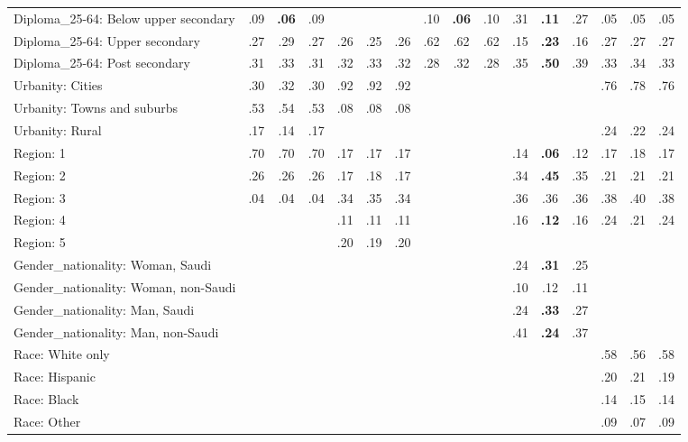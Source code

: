 \begin{tabular}[t]{lccccccccccccccc}
\addlinespace
Diploma\_25-64: Below upper secondary & .09 & \textbf{.06} & .09 &  &  &  & .10 & \textbf{.06} & .10 & .31 & \textbf{.11} & .27 & .05 & .05 & .05\\
Diploma\_25-64: Upper secondary & .27 & .29 & .27 & .26 & .25 & .26 & .62 & .62 & .62 & .15 & \textbf{.23} & .16 & .27 & .27 & .27\\
Diploma\_25-64: Post secondary & .31 & .33 & .31 & .32 & .33 & .32 & .28 & .32 & .28 & .35 & \textbf{.50} & .39 & .33 & .34 & .33\\
\addlinespace
Urbanity: Cities & .30 & .32 & .30 & .92 & .92 & .92 &  &  &  &  &  &  & .76 & .78 & .76\\
Urbanity: Towns and suburbs & .53 & .54 & .53 & .08 & .08 & .08 &  &  &  &  &  &  &  &  & \\
Urbanity: Rural & .17 & .14 & .17 &  &  &  &  &  &  &  &  &  & .24 & .22 & .24\\
\addlinespace
Region: 1 & .70 & .70 & .70 & .17 & .17 & .17 &  &  &  & .14 & \textbf{.06} & .12 & .17 & .18 & .17\\
Region: 2 & .26 & .26 & .26 & .17 & .18 & .17 &  &  &  & .34 & \textbf{.45} & .35 & .21 & .21 & .21\\
Region: 3 & .04 & .04 & .04 & .34 & .35 & .34 &  &  &  & .36 & .36 & .36 & .38 & .40 & .38\\
Region: 4 &  &  &  & .11 & .11 & .11 &  &  &  & .16 & \textbf{.12} & .16 & .24 & .21 & .24\\
Region: 5 &  &  &  & .20 & .19 & .20 &  &  &  &  &  &  &  &  & \\
\addlinespace
Gender\_nationality: Woman, Saudi &  &  &  &  &  &  &  &  &  & .24 & \textbf{.31} & .25 &  &  & \\
Gender\_nationality: Woman, non-Saudi &  &  &  &  &  &  &  &  &  & .10 & .12 & .11 &  &  & \\
Gender\_nationality: Man, Saudi &  &  &  &  &  &  &  &  &  & .24 & \textbf{.33} & .27 &  &  & \\
Gender\_nationality: Man, non-Saudi &  &  &  &  &  &  &  &  &  & .41 & \textbf{.24} & .37 &  &  & \\
\addlinespace
Race: White only &  &  &  &  &  &  &  &  &  &  &  &  & .58 & .56 & .58\\
Race: Hispanic &  &  &  &  &  &  &  &  &  &  &  &  & .20 & .21 & .19\\
Race: Black &  &  &  &  &  &  &  &  &  &  &  &  & .14 & .15 & .14\\
Race: Other &  &  &  &  &  &  &  &  &  &  &  &  & .09 & .07 & .09\\
\bottomrule
\end{tabular}